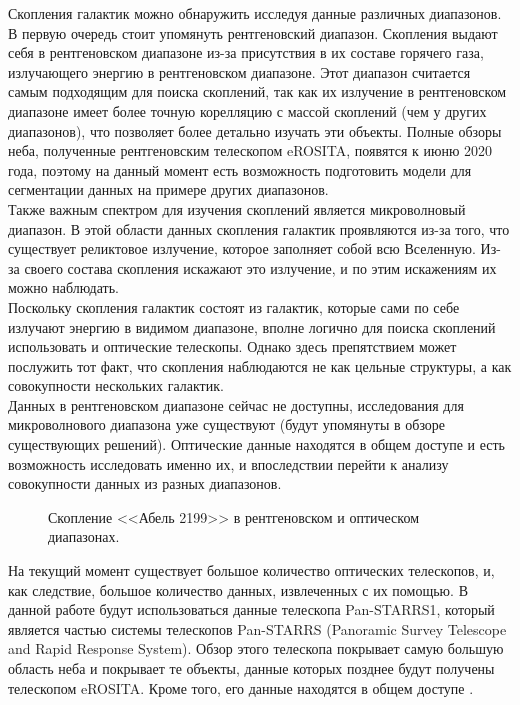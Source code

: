 Скопления галактик можно обнаружить исследуя данные различных диапазонов.\\

В первую очередь стоит упомянуть рентгеновский диапазон. Скопления выдают себя в рентгеновском 
диапазоне из-за присутствия в их составе горячего газа, излучающего энергию в рентгеновском 
диапазоне. Этот диапазон считается самым подходящим для поиска скоплений, так как их излучение 
в рентгеновском диапазоне имеет более точную корелляцию с массой скоплений (чем у других диапазонов), 
что позволяет более детально изучать эти объекты. Полные обзоры неба, полученные рентгеновским 
телескопом eROSITA, появятся к июню 2020 года, поэтому на данный момент есть возможность 
подготовить модели для сегментации данных на примере других диапазонов.\\

Также важным спектром для изучения скоплений является микроволновый диапазон. В этой области данных 
скопления галактик проявляются из-за того, что существует реликтовое излучение, которое заполняет 
собой всю Вселенную. Из-за своего состава скопления искажают это излучение, и по этим искажениям 
их можно наблюдать.\\ 

Поскольку скопления галактик состоят из галактик, которые сами по себе излучают энергию в видимом 
диапазоне, вполне логично для поиска скоплений использовать и оптические телескопы. Однако здесь 
препятствием может послужить тот факт, что скопления наблюдаются не как цельные структуры, а как 
совокупности нескольких галактик. \\

Данных в рентгеновском диапазоне сейчас не доступны, исследования для микроволнового диапазона уже 
существуют (будут упомянуты в обзоре существующих решений). Оптические данные находятся в общем 
доступе и есть возможность исследовать именно их, и впоследствии перейти к анализу совокупности 
данных из разных диапазонов.\\

\begin{figure}[h]
    \caption{Скопление <<Абель 2199>> в рентгеновском и оптическом диапазонах. \cite{Abell}}
\end{figure}


На текущий момент существует большое количество 
оптических телескопов, и, как следствие, большое количество данных, извлеченных с их помощью. В 
данной работе будут использоваться данные телескопа Pan-STARRS1, который является частью системы 
телескопов Pan-STARRS (Panoramic Survey Telescope and Rapid Response System). Обзор этого телескопа
покрывает самую большую область неба и покрывает те объекты, данные которых позднее будут получены 
телескопом eROSITA. Кроме того, его данные находятся в общем доступе \cite{Panstarrs}.\\

